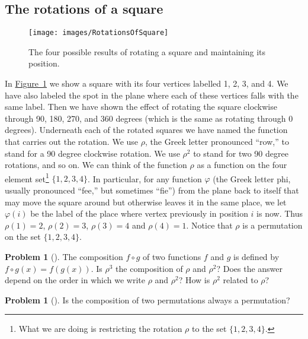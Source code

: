 \documentclass[10pt,]{book}
\theoremstyle{plain}
\theoremstyle{definition}
\newtheorem{activity}[project]{Problem}
\theoremstyle{definition}
\numberwithin{equation}{chapter}
\begin{document}
\subsection[{The rotations of a square}]{The rotations of a square}\label{subsection-58}
\leavevmode%
\begin{figure}
\centering
\texttt{[image: images/RotationsOfSquare]}
\caption{The four possible results of rotating a square and maintaining its position.\label{RotationsOfSquare}}
\end{figure}
\hypertarget{p-1449}{}%
In \hyperref[RotationsOfSquare]{Figure~\ref{RotationsOfSquare}} we show a square with its four vertices labelled 1, 2, 3, and 4. We have also labeled the spot in the plane where each of these vertices falls with the same label. Then we have shown the effect of rotating the square clockwise through 90, 180, 270, and 360 degrees (which is the same as rotating through 0 degrees). Underneath each of the rotated squares we have named the function that carries out the rotation. We use \(\rho\), the Greek letter pronounced ``row,'' to stand for a 90 degree clockwise rotation. We use \(\rho^2\) to stand for two 90 degree rotations, and so on. We can think of the function \(\rho\) as a function on the four element set\footnote{What we are doing is restricting the rotation \(\rho\) to the set \(\{1,2,3,4\}\).\label{fn-19}} \(\{1,2,3,4\}\). In particular, for any function \(\varphi\) (the Greek letter phi, usually pronounced ``fee,'' but sometimes ``fie'') from the plane back to itself that may move the square around but otherwise leaves it in the same place, we let \(\varphi(i)\) be the label of the place where vertex previously in position \(i\) is now. Thus \(\rho(1) =2\), \(\rho(2)=3\), \(\rho(3)=4\) and \(\rho(4) =1\). Notice that \(\rho\) is a permutation on the set \(\{1,2,3,4\}\).%
\begin{activity}[] \label{composition1}
\hypertarget{p-1450}{}%
The composition \(f\circ g\) of two functions \(f\) and \(g\) is defined by \(f\circ g(x) = f(g(x))\). Is \(\rho^3\) the composition of \(\rho\) and \(\rho^2\)? Does the answer depend on the order in which we write \(\rho\) and \(\rho^2\)? How is \(\rho^2\) related to \(\rho\)?%
\end{activity}
\begin{activity}[] \label{activity-249}
\hypertarget{p-1452}{}%
Is the composition of two permutations always a permutation?%
\end{activity}
\end{document}
